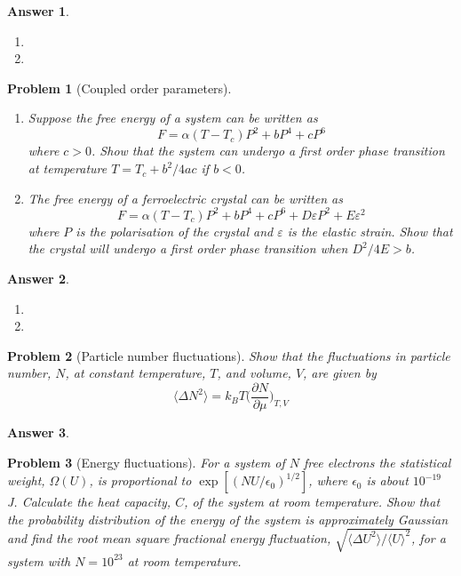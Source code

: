 \documentclass[a4paper]{article}
\newtheorem{ans}{Answer}[section]
\theoremstyle{new}
\newtheorem{qns}{Problem}[section]
\begin{document}
\begin{ans}\leavevmode
\begin{enumerate}[label=(\alph*)]
\item 
\item 
\end{enumerate}
\end{ans}
\newpage
\begin{qns}[Coupled order parameters]\leavevmode
\begin{enumerate}[label=(\roman*)]
\item Suppose the free energy of a system can be written as 
$$F=\alpha(T-T_c)P^2+bP^4+cP^6$$
where $c > 0$. Show that the system can undergo a first order phase transition at temperature $T = T_c + b^2/4ac$ if $b < 0$. 
\item The free energy of a ferroelectric crystal can be written as 
$$F=\alpha(T-T_c)P^2+bP^4+cP^6+D\varepsilon P^2+E\varepsilon^2$$
where $P$ is the polarisation of the crystal and $\varepsilon$ is the elastic strain. Show that the crystal will undergo a first order phase transition when $D^2/4E>b$.
\end{enumerate}
\end{qns}
\begin{ans}\leavevmode
\begin{enumerate}[label=(\roman*)]
\item 

\item 

\end{enumerate}
\end{ans}
\newpage
\begin{qns}[Particle number fluctuations]
Show that the fluctuations in particle number, $N$, at constant temperature, $T$, and volume, $V$, are given by 
$$\langle\Delta N^2\rangle=k_BT\bigg(\frac{\partial N}{\partial\mu}\bigg)_{T,V}$$
\end{qns}
\begin{ans}

\end{ans}
\begin{qns}[Energy fluctuations]
For a system of $N$ free electrons the statistical weight, $\Omega(U)$, is proportional to $\exp[(NU/\epsilon_0)^{1/2}]$, where $\epsilon_0$ is about $10^{−19}$ J. Calculate the heat capacity, $C$, of the system at room temperature. Show that the probability distribution of the energy of the system is approximately Gaussian and find the root mean square fractional energy fluctuation, $\sqrt{\langle\Delta U^2\rangle/\langle U\rangle^2}$, for a system with $N = 10^{23}$ at room temperature. 
\end{qns}
\end{document}
